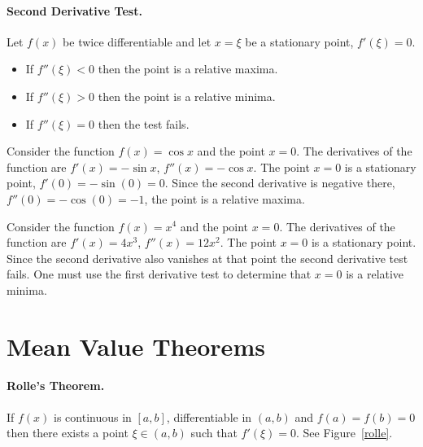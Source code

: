 \paragraph{Second Derivative Test.}
Let $f(x)$ be twice differentiable and let $x = \xi$ be a stationary 
point, $f'(\xi) = 0$.
\begin{itemize}
\item
  If $f''(\xi) < 0$ then the point is a relative maxima.
\item
  If $f''(\xi) > 0$ then the point is a relative minima.
\item
  If $f''(\xi) = 0$ then the test fails.
\end{itemize}




\begin{Example}
  Consider the function $f(x) = \cos x$ and the point $x = 0$.  The derivatives
  of the function are $f'(x) = - \sin x$, $f''(x) = - \cos x$.  The point
  $x = 0$ is a stationary point, $f'(0) = - \sin(0) = 0$.  Since the second
  derivative is negative there, $f''(0) = - \cos(0) = -1$, the point is a 
  relative maxima.
\end{Example}






\begin{Example}
  Consider the function $f(x) = x^4$ and the point $x = 0$.  The derivatives
  of the function are $f'(x) = 4 x^3$, $f''(x) = 12 x^2$.  The point
  $x = 0$ is a stationary point.  Since the second derivative also 
  vanishes at that point the second derivative test fails.  One must use
  the first derivative test to determine that $x = 0$ is a relative minima.
\end{Example}








\section{Mean Value Theorems}


\paragraph{Rolle's Theorem.}
If $f(x)$ is continuous in $[a,b]$, differentiable in $(a,b)$ and
$f(a) = f(b) = 0$ then there exists a point $\xi \in (a,b)$ such that
$f'(\xi) = 0$.  See Figure~\ref{rolle}.

